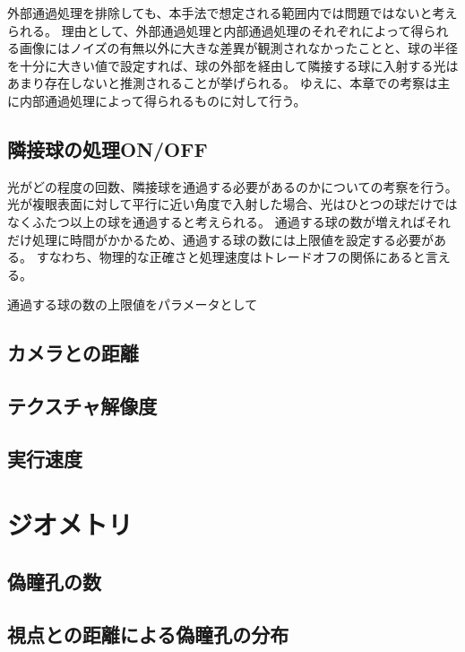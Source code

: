 外部通過処理を排除しても、本手法で想定される範囲内では問題ではないと考えられる。
理由として、外部通過処理と内部通過処理のそれぞれによって得られる画像にはノイズの有無以外に大きな差異が観測されなかったことと、球の半径を十分に大きい値で設定すれば、球の外部を経由して隣接する球に入射する光はあまり存在しないと推測されることが挙げられる。
ゆえに、本章での考察は主に内部通過処理によって得られるものに対して行う。

\subsection{隣接球の処理ON/OFF}
\label{SS}

光がどの程度の回数、隣接球を通過する必要があるのかについての考察を行う。
光が複眼表面に対して平行に近い角度で入射した場合、光はひとつの球だけではなくふたつ以上の球を通過すると考えられる。
通過する球の数が増えればそれだけ処理に時間がかかるため、通過する球の数には上限値を設定する必要がある。
すなわち、物理的な正確さと処理速度はトレードオフの関係にあると言える。

通過する球の数の上限値をパラメータとして


\subsection{カメラとの距離}
\label{SSCameraDist}

\subsection{テクスチャ解像度}
\label{SSTexReso}

\subsection{実行速度}
\label{SS}

\section{ジオメトリ}
\label{S}

\subsection{偽瞳孔の数}
\label{SS}

\subsection{視点との距離による偽瞳孔の分布}
\label{SS}

